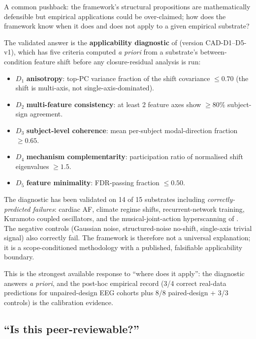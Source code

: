 \documentclass[11pt]{article}
\theoremstyle{plain}
\theoremstyle{definition}
\theoremstyle{remark}
\begin{document}
A common pushback: the framework's structural propositions are mathematically defensible but empirical applications could be over-claimed; how does the framework know when it does and does not apply to a given empirical substrate?

The validated answer is the \textbf{applicability diagnostic} of \citet{SmartClosureDistance} (version CAD-D1--D5-v1), which has five criteria computed \emph{a priori} from a substrate's between-condition feature shift before any closure-residual analysis is run:

\begin{itemize}[leftmargin=2em]
\item $D_1$ \textbf{anisotropy}: top-PC variance fraction of the shift covariance $\leq 0.70$ (the shift is multi-axis, not single-axis-dominated).
\item $D_2$ \textbf{multi-feature consistency}: at least 2 feature axes show $\geq 80\%$ subject-sign agreement.
\item $D_3$ \textbf{subject-level coherence}: mean per-subject modal-direction fraction $\geq 0.65$.
\item $D_4$ \textbf{mechanism complementarity}: participation ratio of normalised shift eigenvalues $\geq 1.5$.
\item $D_5$ \textbf{feature minimality}: FDR-passing fraction $\leq 0.50$.
\end{itemize}

The diagnostic has been validated on 14 of 15 substrates including \emph{correctly-predicted failures}: cardiac AF, climate regime shifts, recurrent-network training, Kuramoto coupled oscillators, and the musical-joint-action hyperscanning of \citet{SolutionLab007}. The negative controls (Gaussian noise, structured-noise no-shift, single-axis trivial signal) also correctly fail. The framework is therefore not a universal explanation; it is a scope-conditioned methodology with a published, falsifiable applicability boundary.

This is the strongest available response to ``where does it apply'': the diagnostic answers \emph{a priori}, and the post-hoc empirical record (3/4 correct real-data predictions for unpaired-design EEG cohorts plus 8/8 paired-design + 3/3 controls) is the calibration evidence.

\subsection{``Is this peer-reviewable?''}
\end{document}

